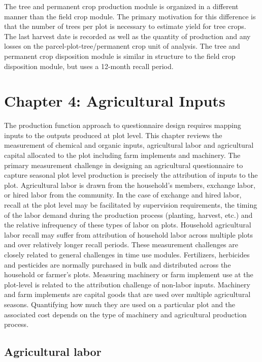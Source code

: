 \documentclass[
]{book}
\begin{document}
The tree and permanent crop production module is organized in a different manner than the field crop module. The primary motivation for this difference is that the number of trees per plot is necessary to estimate yield for tree crops. The last harvest date is recorded as well as the quantity of production and any losses on the parcel-plot-tree/permanent crop unit of analysis. The tree and permanent crop disposition module is similar in structure to the field crop disposition module, but uses a 12-month recall period.

\hypertarget{chapter-4-agricultural-inputs}{%
\chapter{Chapter 4: Agricultural Inputs}\label{chapter-4-agricultural-inputs}}

The production function approach to questionnaire design requires mapping inputs to the outputs produced at plot level. This chapter reviews the measurement of chemical and organic inputs, agricultural labor and agricultural capital allocated to the plot including farm implements and machinery. The primary measurement challenge in designing an agricultural questionnaire to capture seasonal plot level production is precisely the attribution of inputs to the plot. Agricultural labor is drawn from the household's members, exchange labor, or hired labor from the community. In the case of exchange and hired labor, recall at the plot level may be facilitated by supervision requirements, the timing of the labor demand during the production process (planting, harvest, etc.) and the relative infrequency of these types of labor on plots. Household agricultural labor recall may suffer from attribution of household labor across multiple plots and over relatively longer recall periods. These measurement challenges are closely related to general challenges in time use modules. Fertilizers, herbicides and pesticides are normally purchased in bulk and distributed across the household or farmer's plots. Measuring machinery or farm implement use at the plot-level is related to the attribution challenge of non-labor inputs. Machinery and farm implements are capital goods that are used over multiple agricultural seasons. Quantifying how much they are used on a particular plot and the associated cost depends on the type of machinery and agricultural production process.

\hypertarget{agricultural-labor}{%
\section{Agricultural labor}\label{agricultural-labor}}
\end{document}
